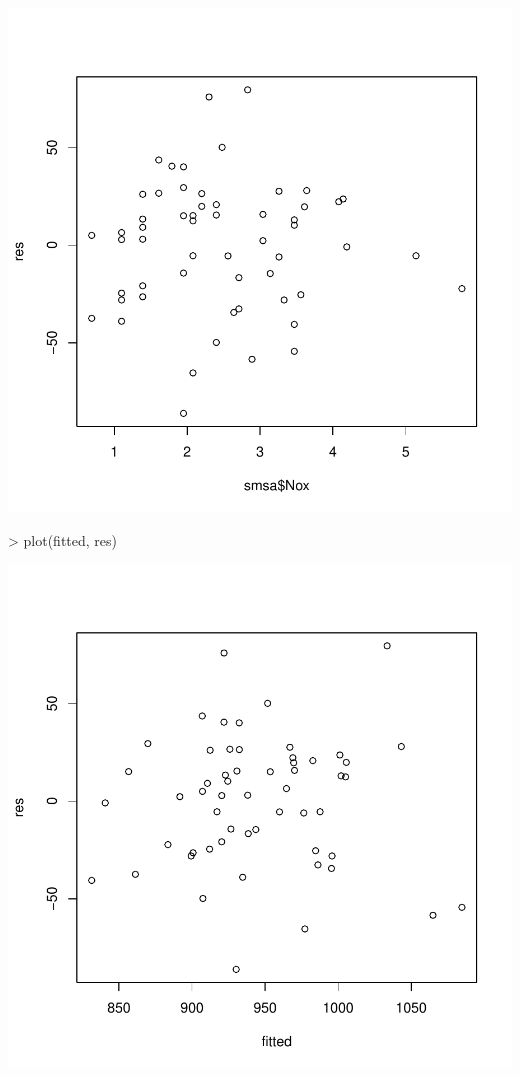 \documentclass{article}
\begin{document}
\begin{Schunk}
\end{Schunk}
\includegraphics{Assignment2b-010}

\begin{Schunk}
\begin{Sinput}
> plot(fitted, res)
\end{Sinput}
\end{Schunk}
\includegraphics{Assignment2b-011}
\end{document}
